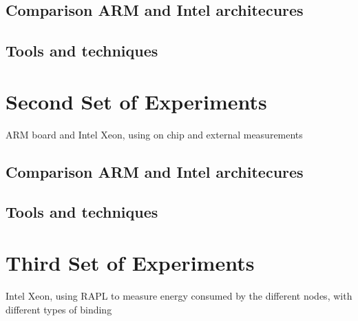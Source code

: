 \subsection{Comparison ARM and Intel architecures}
\subsection{Tools and techniques}

\section{Second Set of Experiments}
ARM board and Intel Xeon, using on chip and external measurements

\subsection{Comparison ARM and Intel architecures}
\subsection{Tools and techniques}


\section{Third Set of Experiments}
Intel Xeon, using RAPL to measure energy consumed by the different nodes, with
different types of binding
